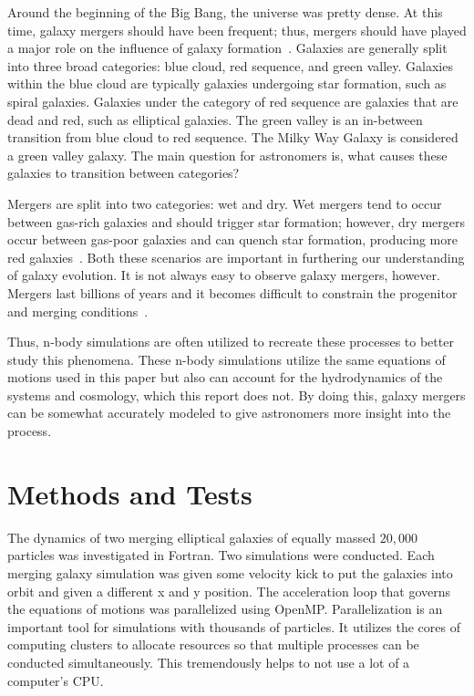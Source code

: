 \documentclass[12pt]{report}
\begin{document}
Around the beginning of the Big Bang, the universe was pretty dense. At this time, galaxy mergers should have been frequent; thus, mergers should have played a major role on the influence of galaxy formation~\cite{mergers}. Galaxies are generally split into three broad categories: blue cloud, red sequence, and green valley. Galaxies within the blue cloud are typically galaxies undergoing star formation, such as spiral galaxies. Galaxies under the category of red sequence are galaxies that are dead and red, such as elliptical galaxies. The green valley is an in-between transition from blue cloud to red sequence. The Milky Way Galaxy is considered a green valley galaxy. The main question for astronomers is, what causes these galaxies to transition between categories?

Mergers are split into two categories: wet and dry. Wet mergers tend to occur between gas-rich galaxies and should trigger star formation; however, dry mergers occur between gas-poor galaxies and can quench star formation, producing more red galaxies~\cite{2008ApJ}. Both these scenarios are important in furthering our understanding of galaxy evolution. It is not always easy to observe galaxy mergers, however. Mergers last billions of years and it becomes difficult to constrain the progenitor and merging conditions~\cite{2008MNRAS}. 

Thus, n-body simulations are often utilized to recreate these processes to better study this phenomena. These n-body simulations utilize the same equations of motions used in this paper but also can account for the hydrodynamics of the systems and cosmology, which this report does not. By doing this, galaxy mergers can be somewhat accurately modeled to give astronomers more insight into the process.




\section*{Methods and Tests}
The dynamics of two merging elliptical galaxies of equally massed $20,000$ particles was investigated in Fortran. Two simulations were conducted. Each merging galaxy simulation was given some velocity kick to put the galaxies into orbit and given a different x and y position. The acceleration loop that governs the equations of motions was parallelized using OpenMP. Parallelization is an important tool for simulations with thousands of particles. It utilizes the cores of computing clusters to allocate resources so that multiple processes can be conducted simultaneously. This tremendously helps to not use a lot of a computer's CPU.
\end{document}
